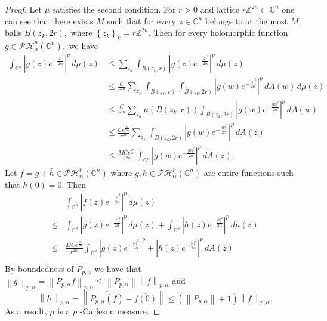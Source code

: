 \documentclass[10pt,leqno]{amsart}
\theoremstyle{remark}
\numberwithin{equation}{section}
\newcommand{\ph}{\mathcal{PH}_\alpha^p(\mathbb{C}^n)}%
\begin{document}
\begin{proof}
	Let $\mu$ satisfies the second condition. For $r>0$  and lattice $r\mathbb{Z}^{2n}\subset \mathbb{C}^{n}$ one can see that there exists $M$  such that for every $z \in \mathbb{C}^{n}$ belongs to at the most $M$ balls $B(z_k,2r),$ where $\left\{ z_k \right\} _k = r\mathbb{Z}^{2n}.$ Then for every holomorphic function $g \in \ph,$ we have
	\begin{align*}
		\int_{\mathbb{C}^{n}}^{}\left| g(z) e^{-\frac{|z|^2}{2\alpha}}\right| ^{p}\, d\mu(z)
		 & \leq \sum_{z_k}^{} \int_{B(z_k,r)}^{}\left| g(z)e^{-\frac{|z|^2}{2\alpha}} \right| ^{p}\, d\mu(z)                                              \\
		 & \leq \frac{C}{r^{2n}} \sum_{z_k}^{} \int_{B(z_k,r)}^{}\int_{B(z_k,2r)}^{}\left| g(w)e^{-\frac{|z|^2}{2\alpha}} \right| ^{p}\, dA(w) \, d\mu(z) \\
		 & \leq \frac{C}{r^{2n}}\sum_{z_k}^{} \mu(B(z_k,r))\int_{B(z_k,2r)}^{}\left| g(w)e^{-\frac{|w|^2}{2\alpha}} \right| ^{p}\, dA(w)                  \\
		 & \leq \frac{C e^{\frac{pr}{2\alpha}}}{r^{2n}}\sum_{z_k}^{} \int_{B(z_k,2r)}^{}\left| g(w)e^{-\frac{|w|^2}{2\alpha}} \right| ^{p}\, dA(z)        \\
		 & \leq \frac{M C e^{\frac{pr}{2\alpha}}}{r^{2n}} \int_{\mathbb{C}^{n}}^{}\left| g(w)e^{-\frac{|w|^2}{2\alpha}} \right| ^{p}\, dA(z) .
	\end{align*}
	Let $f =g+\bar{h} \in \ph$ where $g,h \in \ph$ are entire functions such that $h(0)=0.$ Then
	\begin{align*}
		     & \int_{\mathbb{C}^{n}}^{}\left| f(z)e^{-\frac{|z|^2}{2\alpha}} \right|^{p} \, d\mu(z)                                                                                              \\ \leq                                                                                                                    & \int_{\mathbb{C}^{n}}^{}\left| g(z)e^{-\frac{|z|^2}{2\alpha}} \right| ^p\, d\mu(z) + \int_{\mathbb{C}^{n}}^{}\left| h(z)e^{-\frac{|z|^2}{2\alpha}} \right| ^{p}	\, d\mu(z) \\
		\leq & \frac{M C e^{\frac{pr}{2\alpha}}}{r^{2n}} \int_{\mathbb{C}^{n}}^{}\left| g(z)e^{-\frac{|z|^2}{2\alpha}} \right| ^{p} + \left| h(z)e^{-\frac{|z|^2}{2\alpha}} \right| ^{p}\, dA(z) \\
	\end{align*}
	By boundedness of $P_{p,\alpha}$ we have that $\left\lVert g \right\rVert _{p,\alpha} = \left\lVert P_{p,\alpha} f \right\rVert _{p,\alpha} \leq \left\lVert P_{p,\alpha} \right\rVert  \left\lVert f \right\rVert _{p,\alpha}$ and
	\[
		\left\lVert h \right\rVert _{p,\alpha} = \left\lVert \overline{P_{p,\alpha}(\bar{f})}-\overline{f(0)} \right\rVert \leq (\left\lVert P_{p,\alpha} \right\rVert +1) \left\lVert f \right\rVert _{p,\alpha}.
	\]
	As a result, $\mu$  is a $p$ -Carleson measure.
\end{proof}
\end{document}
